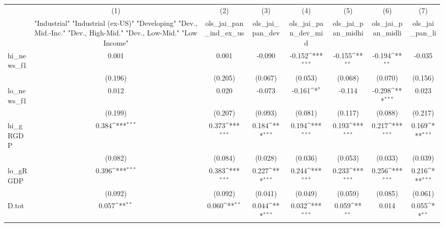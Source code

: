 {
\def\sym#1{\ifmmode^{#1}\else\(^{#1}\)\fi}
\begin{tabular}{l*{7}{c}}
\toprule
            &\multicolumn{1}{c}{(1)}&\multicolumn{1}{c}{(2)}&\multicolumn{1}{c}{(3)}&\multicolumn{1}{c}{(4)}&\multicolumn{1}{c}{(5)}&\multicolumn{1}{c}{(6)}&\multicolumn{1}{c}{(7)}\\
            &\multicolumn{1}{c}{ "Industrial" "Industrial (ex-US)" "Developing" "Dev., Mid.-Inc." "Dev., High-Mid."  "Dev., Low-Mid." "Low Income" }&\multicolumn{1}{c}{ols\_jai\_pan\_ind\_ex\_us}&\multicolumn{1}{c}{ols\_jai\_pan\_dev}&\multicolumn{1}{c}{ols\_jai\_pan\_dev\_mid}&\multicolumn{1}{c}{ols\_jai\_pan\_midhi}&\multicolumn{1}{c}{ols\_jai\_pan\_midli}&\multicolumn{1}{c}{ols\_jai\_pan\_li}\\
\midrule
hi\_news\_f1  &       0.001         &       0.001         &      -0.090         &      -0.152\sym{***}&      -0.155\sym{**} &      -0.194\sym{**} &      -0.035         \\
            &     (0.196)         &     (0.205)         &     (0.067)         &     (0.053)         &     (0.068)         &     (0.070)         &     (0.156)         \\
\addlinespace
lo\_news\_f1  &       0.012         &       0.020         &      -0.073         &      -0.161\sym{*}  &      -0.114         &      -0.298\sym{***}&       0.023         \\
            &     (0.199)         &     (0.207)         &     (0.093)         &     (0.081)         &     (0.117)         &     (0.088)         &     (0.217)         \\
\addlinespace
hi\_gRGDP    &       0.384\sym{***}&       0.373\sym{***}&       0.184\sym{***}&       0.194\sym{***}&       0.193\sym{***}&       0.217\sym{***}&       0.169\sym{***}\\
            &     (0.082)         &     (0.084)         &     (0.028)         &     (0.036)         &     (0.053)         &     (0.033)         &     (0.039)         \\
\addlinespace
lo\_gRGDP    &       0.396\sym{***}&       0.383\sym{***}&       0.227\sym{***}&       0.244\sym{***}&       0.233\sym{***}&       0.256\sym{***}&       0.216\sym{***}\\
            &     (0.092)         &     (0.092)         &     (0.041)         &     (0.049)         &     (0.059)         &     (0.085)         &     (0.061)         \\
\addlinespace
D.tot       &       0.057\sym{**} &       0.060\sym{**} &       0.044\sym{***}&       0.032\sym{***}&       0.059\sym{**} &       0.014         &       0.055\sym{**} \\

\end{tabular}}
